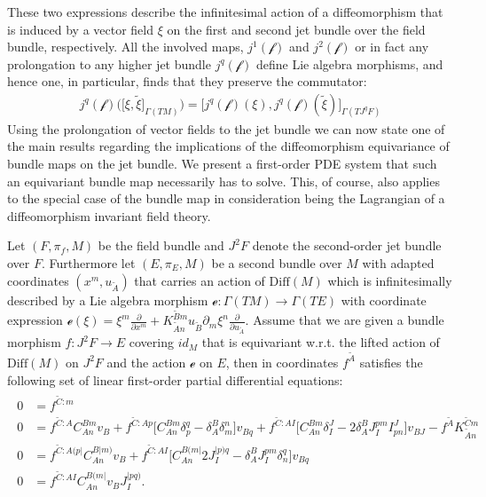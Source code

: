 These two expressions describe the infinitesimal action of a diffeomorphism that is induced by a vector field $\xi$ on the first and second jet bundle over the field bundle, respectively. 
All the involved maps, $j^1(\mathcal{f})$ and $j^2(\mathcal{f})$ or in fact any prolongation to any higher jet bundle $j^q(\mathcal{f})$ define Lie algebra morphisms, and hence one, in particular, finds that they preserve the commutator:
\begin{align}
j^q (\mathcal{f})\bigl (  \bigl [\xi, \tilde{\xi}  \bigr ]_{\Gamma(TM)}\bigr) =  \bigl [ j^q(\mathcal{f})(\xi), j^q(\mathcal{f})(\tilde{\xi}) \bigr ]_{\Gamma(TJ^qF)}
\end{align}
Using the prolongation of vector fields to the jet bundle we can now state one of the main results regarding the implications of the diffeomorphism equivariance of bundle maps on the jet bundle. We present a first-order PDE system that
such an equivariant bundle map necessarily has to solve. 
This, of course, also applies to the special case of the bundle map in consideration being
the Lagrangian of a diffeomorphism invariant field theory. 
\begin{theorem}
Let $(F,\pi_f,M)$ be the field bundle and $J^2F$ denote the second-order jet bundle over $F$. Furthermore let $(E, \pi_E, M)$ be a second bundle over $M$ with adapted coordinates $(x^m, u_{\tilde{A}})$ that carries an action of $\mathrm{Diff}(M)$ which is infinitesimally described by a Lie algebra morphism $\mathcal{e}: \Gamma(TM) \rightarrow \Gamma(TE)$ with coordinate expression $\mathcal{e}(\xi) = \xi^m \frac{\partial}{\partial x^m} + K_{\tilde{A}n}^{\tilde{B}m} u_{\tilde{B}} \partial_m \xi^n \frac{\partial}{\partial u_{\tilde{A}}}$. Assume that we are given a bundle morphism $f : J^2F \rightarrow E$ covering $id_M$ that is equivariant w.r.t. the lifted action of $\mathrm{Diff}(M)$ on $J^2F$ and the action $\mathcal{e}$ on $E$, then in coordinates $f^{\tilde{A}}$ satisfies the following set of linear first-order partial differential equations:
\begin{align}
\begin{aligned}
    0 &= f^{\tilde{C}:m} \\
    0 &= f^{\tilde{C}:A} C_{An}^{Bm} v_B + f^{\tilde{C}:Ap} \bigl[ C_{An}^{Bm} \delta_p^q - \delta_A^B \delta_m^n \bigr] v_{Bq} + f^{\tilde{C}:AI} \bigl[ C_{An}^{Bm} \delta_I^J - 2 \delta_A^B J_I^{pm} I^J_{pn}  \bigr] v_{BJ} - f^{\tilde{A}}K_{\tilde{A}n}^{\tilde{C}m}\\
    0 &= f^{\tilde{C}:A(p\vert}C_{An}^{B \vert m)} v_B + f^{\tilde{C}: AI} \bigl[ C_{An}^{B(m\vert} 2 J_I^{\vert p) q} - \delta^B_A J_I ^{pm} \delta_n^q \bigr] v_{Bq} \\
    0 &= f^{\tilde{C}:AI} C_{An}^{B(m\vert} v_B J_I^{\vert p q )}.
\end{aligned}
\end{align}
\end{theorem}
